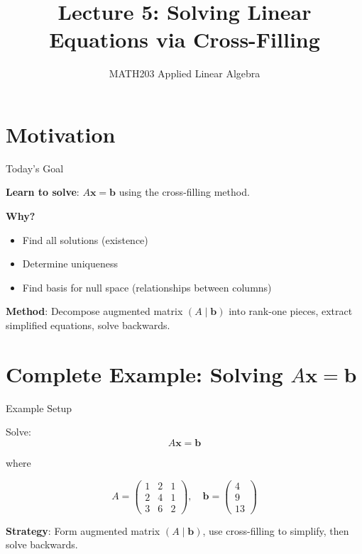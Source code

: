 \documentclass[10pt]{beamer}
\title{Lecture 5: Solving Linear Equations via Cross-Filling}
\subtitle{MATH203 Applied Linear Algebra}
\date{}
\theoremstyle{definition}
\newcommand{\x}[1]{\alert{\textbf{#1}}}
\begin{document}
\maketitle

\section{Motivation}

\begin{frame}{Today's Goal}

\x{Learn to solve}: $A\mathbf{x} = \mathbf{b}$ using the cross-filling method.

\vspace{1em}

\x{Why?}
\begin{itemize}
\item Find all solutions (existence)
\item Determine uniqueness
\item Find basis for null space (relationships between columns)
\end{itemize}

\vspace{1em}

\x{Method}: Decompose augmented matrix $(A \mid \mathbf{b})$ into rank-one pieces, extract simplified equations, solve backwards.

\end{frame}

\section{Complete Example: Solving $A\mathbf{x} = \mathbf{b}$}

\begin{frame}{Example Setup}

Solve:
$$A\mathbf{x} = \mathbf{b}$$

where

$$A = \begin{pmatrix}
1 & 2 & 1 \\
2 & 4 & 1 \\
3 & 6 & 2
\end{pmatrix}, \quad \mathbf{b} = \begin{pmatrix} 4 \\ 9 \\ 13 \end{pmatrix}$$

\vspace{1em}

\x{Strategy}: Form augmented matrix $(A \mid \mathbf{b})$, use cross-filling to simplify, then solve backwards.

\end{frame}
\end{document}
